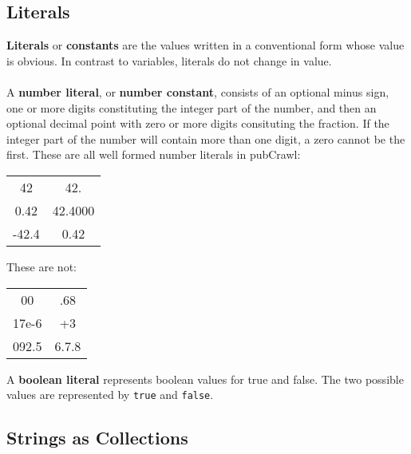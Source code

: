 \documentclass[oneside]{book}
\begin{document}
\subsection{Literals}
\textbf{Literals} or \textbf{constants} are the values written in a conventional form whose value is obvious. In contrast to variables, literals do not change in value.\\\\
A \textbf{number literal}, or \textbf{number constant}, consists of an optional minus sign, one or more digits constituting the integer part of the number, and then an optional decimal point with zero or more digits consituting the fraction. If the integer part of the number will contain more than one digit, a zero cannot be the first. These are all well formed number literals in pubCrawl: 
\begin{center}
  \begin{tabular}{c c}
  42&42.\\
  0.42&42.4000\\
  -42.4&0.42\\
  \end{tabular}
\end{center}
These are not: 
\begin{center}
  \begin{tabular}{c c}
  00&.68\\
  17e-6&+3\\
  092.5&6.7.8\\
  \end{tabular}
\end{center}
A \textbf{boolean literal} represents boolean values for true and false. The two possible values are represented by \texttt{true} and \texttt{false}.

\subsection{Strings as Collections}
\end{document}
